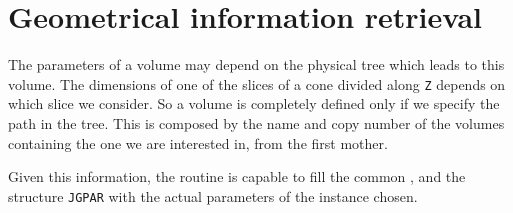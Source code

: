 \section{Geometrical information retrieval}

The parameters of a volume may depend on the physical tree which leads to
this volume. The dimensions of one of the slices of a cone divided along
{\tt Z} depends on which slice we consider. So a volume is completely
defined only if we specify the path in the tree. This is composed by the
name and copy number of the volumes containing the one we are interested
in, from the first mother.

Given this information, the routine  is capable to fill the
common , and the structure {\tt JGPAR} with the actual
parameters of the instance chosen.
